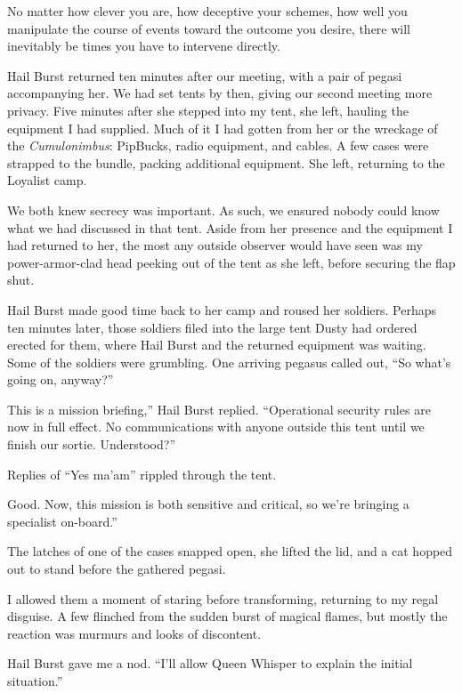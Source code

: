 No matter how clever you are, how deceptive your schemes, how well you manipulate the course of events toward the outcome you desire, there will inevitably be times you have to intervene directly.

Hail Burst returned ten minutes after our meeting, with a pair of pegasi accompanying her. We had set tents by then, giving our second meeting more privacy. Five minutes after she stepped into my tent, she left, hauling the equipment I had supplied. Much of it I had gotten from her or the wreckage of the \textit{Cumulonimbus}: PipBucks, radio equipment, and cables. A few cases were strapped to the bundle, packing additional equipment. She left, returning to the Loyalist camp.

We both knew secrecy was important. As such, we ensured nobody could know what we had discussed in that tent. Aside from her presence and the equipment I had returned to her, the most any outside observer would have seen was my power-armor-clad head peeking out of the tent as she left, before securing the flap shut.

Hail Burst made good time back to her camp and roused her soldiers. Perhaps ten minutes later, those soldiers filed into the large tent Dusty had ordered erected for them, where Hail Burst and the returned equipment was waiting. Some of the soldiers were grumbling. One arriving pegasus called out, “So what’s going on, anyway?”

\leavevmode{}This is a mission briefing,” Hail Burst replied. “Operational security rules are now in full effect. No communications with anyone outside this tent until we finish our sortie. Understood?”

Replies of “Yes ma’am” rippled through the tent.

\leavevmode{}Good. Now, this mission is both sensitive and critical, so we’re bringing a specialist on-board.”

The latches of one of the cases snapped open, she lifted the lid, and a cat hopped out to stand before the gathered pegasi.

I allowed them a moment of staring before transforming, returning to my regal disguise. A few flinched from the sudden burst of magical flames, but mostly the reaction was murmurs and looks of discontent.

Hail Burst gave me a nod. “I’ll allow Queen Whisper to explain the initial situation.”

